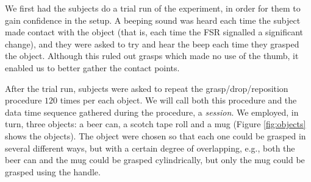 We first had the subjects do a trial run of the experiment, in order
for them to gain confidence in the setup. A beeping sound was heard
each time the subject made contact with the object (that is, each time
the FSR signalled a significant change), and they were asked to try
and hear the beep each time they grasped the object. Although this
ruled out grasps which made no use of the thumb, it enabled us to
better gather the contact points.

After the trial run, subjects were asked to repeat the
grasp/drop/reposition procedure $120$ times per each object. We will
call both this procedure and the data time sequence gathered during
the procedure, a \emph{session}. We employed, in turn, three objects:
a beer can, a scotch tape roll and a mug (Figure \ref{fig:objects}
shows the objects). The object were chosen so that each one could be
grasped in several different ways, but with a certain degree of
overlapping, e.g., both the beer can and the mug could be grasped
cylindrically, but only the mug could be grasped using the handle.


